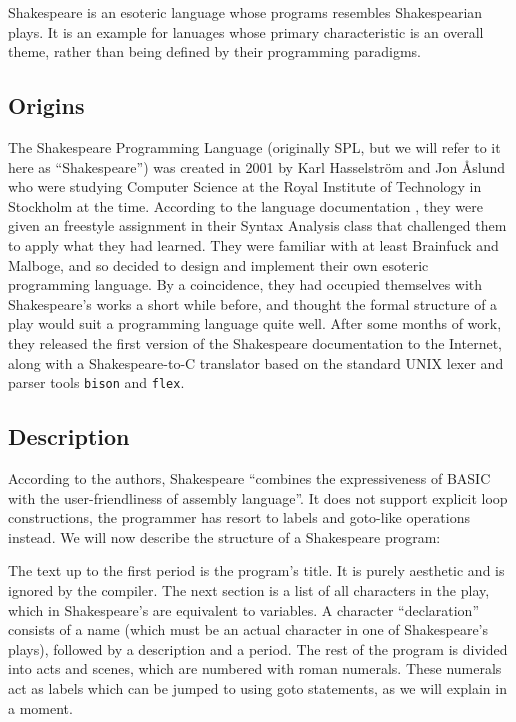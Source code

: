 Shakespeare is an esoteric language whose programs resembles Shakespearian plays. It is an example for lanuages whose primary characteristic is an overall theme, rather than being defined by their programming paradigms.

\subsection{Origins}

The Shakespeare Programming Language (originally SPL, but we will refer to it here as “Shakespeare”) was created in 2001 by Karl Hasselström and Jon Åslund who were studying Computer Science at the Royal Institute of Technology in Stockholm at the time. According to the language documentation \cite{hasselstrom2001shakespeare}, they were given an freestyle assignment in their Syntax Analysis class that challenged them to apply what they had learned. They were familiar with at least Brainfuck and Malboge, and so decided to design and implement their own esoteric programming language. By a coincidence, they had occupied themselves with Shakespeare's works a short while before, and thought the formal structure of a play would suit a programming language quite well. After some months of work, they released the first version of the Shakespeare documentation to the Internet, along with a Shakespeare-to-C translator based on the standard UNIX lexer and parser tools \texttt{bison} and \texttt{flex}.

\subsection{Description}

According to the authors, Shakespeare “combines the expressiveness of BASIC with the user-friendliness of assembly language”. It does not support explicit loop constructions, the programmer has resort to labels and goto-like operations instead. We will now describe the structure of a Shakespeare program:

The text up to the first period is the program's title. It is purely aesthetic and is ignored by the compiler. The next section is a list of all characters in the play, which in Shakespeare's are equivalent to variables. A character “declaration” consists of a name (which must be an actual character in one of Shakespeare's plays), followed by a description and a period. The rest of the program is divided into acts and scenes, which are numbered with roman numerals. These numerals act as labels which can be jumped to using goto statements, as we will explain in a moment.

